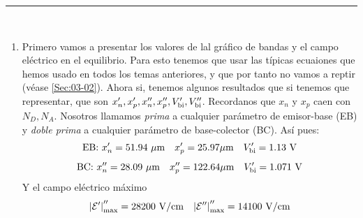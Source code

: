 \rule{\textwidth}{0.1pt} \\[2pt]

\begin{enumerate}[label=\alph*)]
    \item Primero vamos a presentar los valores de lal gráfico de bandas y el campo eléctrico en el equilibrio. Para esto tenemos que usar las típicas ecuaiones que hemos usado en todos los temas anteriores, y que por tanto no vamos a reptir (véase \ref{Sec:03-02}). Ahora si, tenemos algunos resultados que si tenemos que representar, que son $x_n',x_p',x_n'',x_p'',V_{\text{bi}}',V_{\text{bi}}''$. Recordanos que $x_n$ y $x_p$ caen con $N_D,N_A$.  Nosotros llamamos \textit{prima} a cualquier parámetro de emisor-base (EB) y \textit{doble prima} a cualquier parámetro de base-colector (BC). Así pues:
    \begin{equation}
        \text{EB:} \ x_n'=51.94 \ \mu \unit{m} \quad  x_p'=25.97  \mu \unit{m} \quad \Vbi'=1.13 \ \unit{V}
    \end{equation}
    \begin{equation}
        \text{BC:} \ x_n''=28.09 \ \mu \unit{m} \quad  x_p''=122.64  \mu \unit{m} \quad \Vbi'= 1.071 \ \unit{V}
    \end{equation}
    Y el campo eléctrico máximo
    \begin{equation}
       \abs{\Ecal'}_{\max}''=28200 \ \unit{V/cm} \quad  
       \abs{\Ecal''}_{\max}''=14100 \ \unit{V/cm} 
    \end{equation}


\end{enumerate}
